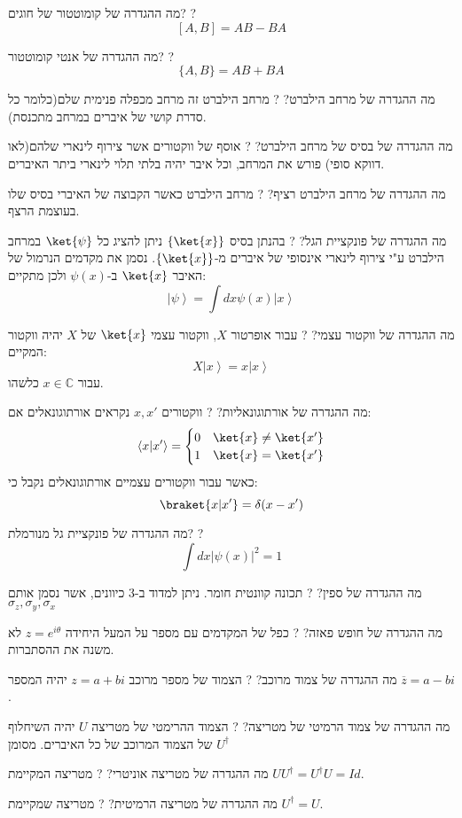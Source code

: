 \documentclass{tstextbook}
\begin{document}
מה ההגדרה של קומוטטור של חוגים?
?
$$[A,B]=AB-BA$$

מה ההגדרה של אנטי קומוטטור?
?
$$\{A,B\}=AB+BA$$

מה ההגדרה של מרחב הילברט?
?
מרחב הילברט זה מרחב מכפלה פנימית שלם(כלומר כל סדרת קושי של איברים במרחב מתכנסת).

מה ההגדרה של בסיס של מרחב הילברט?
?
אוסף של ווקטורים אשר צירוף לינארי שלהם(לאו דווקא סופי) פורש את המרחב, וכל איבר יהיה בלתי תלוי לינארי ביתר האיברים.

מה ההגדרה של מרחב הילברט רציף?
?
מרחב הילברט כאשר הקבוצה של האיברי בסיס שלו בעוצמת הרצף.

מה ההגדרה של פונקציית הגל?
?
בהנתן בסיס \(\left\{  \ket{x}  \right\}\) ניתן להציג כל \(\ket{\psi}\) במרחב הילברט ע"י צירוף לינארי אינסופי של איברים מ-\(\left\{  \ket{x}  \right\}\). נסמן את מקדמים הנרמול של האיבר \(\ket{x}\) ב-\(\psi(x)\) ולכן מתקיים:
$$\left|\psi\right\rangle=\int d x\psi\left(x\right)\left|x\right\rangle$$

מה ההגדרה של ווקטור עצמי?
?
עבור אופרטור \(X\), ווקטור עצמי \(\ket{x}\) של \(X\) יהיה ווקטור המקיים:
$$X\left|x\right\rangle=x\left|x\right\rangle$$
עבור \(x \in \mathbb{C}\) כלשהו.

מה ההגדרה של אורתוגונאליות?
?
ווקטורים \(x,x'\) נקראים אורתוגונאלים אם:
$$\left\langle  x|x^{\prime} \right\rangle=\begin{cases}0 & \ket{x} \neq \ket{x'} \\1 & \ket{x} =\ket{x'}  
\end{cases}$$
כאשר עבור ווקטורים עצמיים אורתוגונאלים נקבל כי:
$$\braket{ x | x' } =\delta(x-x')  $$

מה ההגדרה של פונקציית גל מנורמלת?
?
$$\int d x\left|\psi\left(x\right)\right|^{2}=1$$

מה ההגדרה של ספין?
?
תכונה קוונטית חומר. ניתן למדוד ב-3 כיוונים, אשר נסמן אותם \(\sigma_{z},\sigma_{y},\sigma_{x}\)

מה ההגדרה של חופש פאזה?
?
כפל של המקדמים עם מספר על המעל היחידה \(z = e^{i\theta}\) לא משנה את ההסתברות.

מה ההגדרה של צמוד מרוכב?
?
הצמוד של מספר מרוכב \(z=a+bi\) יהיה המספר \(\overline{z}=a-bi\).

מה ההגדרה של צמוד הרמיטי של מטריצה?
?
הצמוד ההרימטי של מטריצה \(U\) יהיה השיחלוף של הצמוד המרוכב של כל האיברים. מסומן \(U^{\dagger}\)

מה ההגדרה של מטריצה אוניטרי?
?
מטריצה המקיימת \(U U^{\dagger}=U^{\dagger} U=Id\).

מה ההגדרה של מטריצה הרמיטית?
?
מטריצה שמקיימת \(U^{\dagger}=U\).
\end{document}
